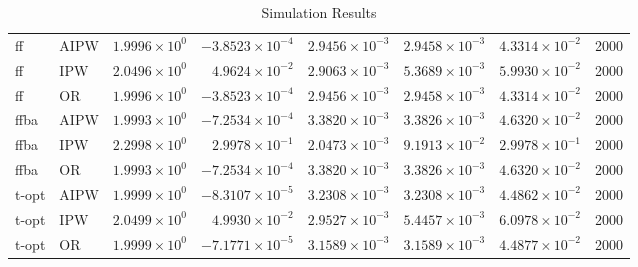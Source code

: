 \begin{table}[ht]
\begin{tabular}{llrrrrrr}
   \midrule
ff & AIPW & $1.9996 \times 10^{0}$ & $-3.8523 \times 10^{-4}$ & $2.9456 \times 10^{-3}$ & $2.9458 \times 10^{-3}$ & $4.3314 \times 10^{-2}$ & 2000 \\ 
  ff & IPW & $2.0496 \times 10^{0}$ & $4.9624 \times 10^{-2}$ & $2.9063 \times 10^{-3}$ & $5.3689 \times 10^{-3}$ & $5.9930 \times 10^{-2}$ & 2000 \\ 
  ff & OR & $1.9996 \times 10^{0}$ & $-3.8523 \times 10^{-4}$ & $2.9456 \times 10^{-3}$ & $2.9458 \times 10^{-3}$ & $4.3314 \times 10^{-2}$ & 2000 \\ 
   \midrule
ffba & AIPW & $1.9993 \times 10^{0}$ & $-7.2534 \times 10^{-4}$ & $3.3820 \times 10^{-3}$ & $3.3826 \times 10^{-3}$ & $4.6320 \times 10^{-2}$ & 2000 \\ 
  ffba & IPW & $2.2998 \times 10^{0}$ & $2.9978 \times 10^{-1}$ & $2.0473 \times 10^{-3}$ & $9.1913 \times 10^{-2}$ & $2.9978 \times 10^{-1}$ & 2000 \\ 
  ffba & OR & $1.9993 \times 10^{0}$ & $-7.2534 \times 10^{-4}$ & $3.3820 \times 10^{-3}$ & $3.3826 \times 10^{-3}$ & $4.6320 \times 10^{-2}$ & 2000 \\ 
   \midrule
t-opt & AIPW & $1.9999 \times 10^{0}$ & $-8.3107 \times 10^{-5}$ & $3.2308 \times 10^{-3}$ & $3.2308 \times 10^{-3}$ & $4.4862 \times 10^{-2}$ & 2000 \\ 
  t-opt & IPW & $2.0499 \times 10^{0}$ & $4.9930 \times 10^{-2}$ & $2.9527 \times 10^{-3}$ & $5.4457 \times 10^{-3}$ & $6.0978 \times 10^{-2}$ & 2000 \\ 
  t-opt & OR & $1.9999 \times 10^{0}$ & $-7.1771 \times 10^{-5}$ & $3.1589 \times 10^{-3}$ & $3.1589 \times 10^{-3}$ & $4.4877 \times 10^{-2}$ & 2000 \\ 
   \bottomrule
\end{tabular}
\caption{Simulation Results} 
\label{tab:results}
\end{table}
